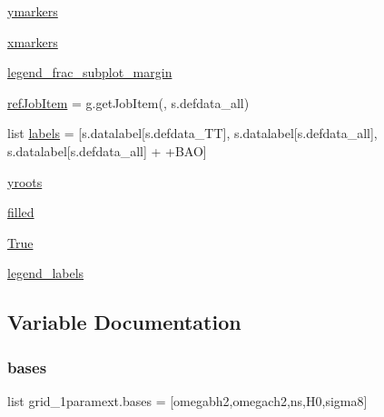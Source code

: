 \begin{DoxyCompactItemize}
\item 
\mbox{\hyperlink{namespacegrid__1paramext_a3c0794b576ac841b6539ce9421385f86}{ymarkers}}
\item 
\mbox{\hyperlink{namespacegrid__1paramext_ab816a7dc291fe7efe13f2a7ab3da6dc0}{xmarkers}}
\item 
\mbox{\hyperlink{namespacegrid__1paramext_a5006df08cce00569dbba31a582657498}{legend\+\_\+frac\+\_\+subplot\+\_\+margin}}
\item 
\mbox{\hyperlink{namespacegrid__1paramext_a154f305903ec5ce4075777eafa49bf59}{ref\+Job\+Item}} = g.\+get\+Job\+Item(\textquotesingle{}\textquotesingle{}, s.\+defdata\+\_\+all)
\item 
list \mbox{\hyperlink{namespacegrid__1paramext_a8547225dca1cbee6d91e97d14b8a8bd9}{labels}} = \mbox{[}s.\+datalabel\mbox{[}s.\+defdata\+\_\+\+TT\mbox{]}, s.\+datalabel\mbox{[}s.\+defdata\+\_\+all\mbox{]}, s.\+datalabel\mbox{[}s.\+defdata\+\_\+all\mbox{]} + \textquotesingle{}+B\+AO\textquotesingle{}\mbox{]}
\item 
\mbox{\hyperlink{namespacegrid__1paramext_a2731920a16306d5469644c200a158844}{yroots}}
\item 
\mbox{\hyperlink{namespacegrid__1paramext_a597a2e3501d58b575d6fdbf7d42a1b87}{filled}}
\item 
\mbox{\hyperlink{namespacegrid__1paramext_a848c8ea6684b6aaaf7df31479ec9b5d4}{True}}
\item 
\mbox{\hyperlink{namespacegrid__1paramext_a9718a4a92804aecd185713306de7daf5}{legend\+\_\+labels}}
\end{DoxyCompactItemize}


\subsection{Variable Documentation}
\mbox{\label{namespacegrid__1paramext_a1ed7dc2e9209eb45af7662ac2820677f}} 
\subsubsection{\texorpdfstring{bases}{bases}}
{\footnotesize\ttfamily list grid\+\_\+1paramext.\+bases = \mbox{[}\textquotesingle{}omegabh2\textquotesingle{},\textquotesingle{}omegach2\textquotesingle{},\textquotesingle{}ns\textquotesingle{},\textquotesingle{}H0\textquotesingle{},\textquotesingle{}sigma8\textquotesingle{}\mbox{]}}

